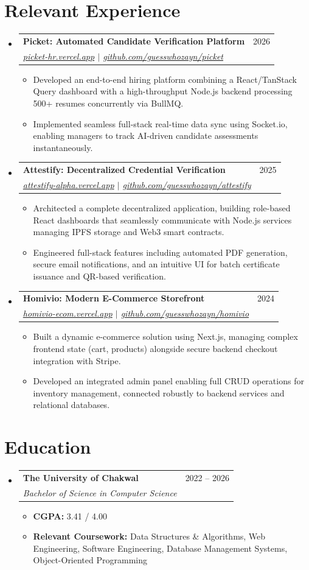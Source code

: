 \documentclass[letterpaper,11pt]{article}
\makeatletter
\newcommand{\resumeItem}[1]{
  \item\small{#1 \vspace{-2pt}}
}
\newcommand{\resumeSubheading}[4]{
  \vspace{-2pt}\item
    \begin{tabular*}{0.97\textwidth}[t]{l@{\extracolsep{\fill}}r}
      \textbf{#1} & #2 \\
      \textit{\small#3} & \textit{\small #4} \\
    \end{tabular*}\vspace{-7pt}
}
\newcommand{\resumeSubHeadingListStart}{\begin{itemize}[leftmargin=0.15in, label={}]}
\newcommand{\resumeSubHeadingListEnd}{\end{itemize}}
\newcommand{\resumeItemListStart}{\begin{itemize}}
\newcommand{\resumeItemListEnd}{\end{itemize}\vspace{-5pt}}
\makeatother
\begin{document}
\section{Relevant Experience}
\resumeSubHeadingListStart

  \resumeSubheading
    {Picket: Automated Candidate Verification Platform}{2026}
    {\href{https://picket-hr.vercel.app}{picket-hr.vercel.app} $|$ \href{https://github.com/guesswhozayn/picket}{github.com/guesswhozayn/picket}}{}
    \resumeItemListStart
      \resumeItem{Developed an end-to-end hiring platform combining a React/TanStack Query dashboard with a high-throughput Node.js backend processing 500+ resumes concurrently via BullMQ.}
      \resumeItem{Implemented seamless full-stack real-time data sync using Socket.io, enabling managers to track AI-driven candidate assessments instantaneously.}
    \resumeItemListEnd

  \resumeSubheading
    {Attestify: Decentralized Credential Verification}{2025}
    {\href{https://attestify-alpha.vercel.app}{attestify-alpha.vercel.app} $|$ \href{https://github.com/guesswhozayn/attestify}{github.com/guesswhozayn/attestify}}{}
    \resumeItemListStart
      \resumeItem{Architected a complete decentralized application, building role-based React dashboards that seamlessly communicate with Node.js services managing IPFS storage and Web3 smart contracts.}
      \resumeItem{Engineered full-stack features including automated PDF generation, secure email notifications, and an intuitive UI for batch certificate issuance and QR-based verification.}
    \resumeItemListEnd

  \resumeSubheading
    {Homivio: Modern E-Commerce Storefront}{2024}
    {\href{https://homivio-ecom.vercel.app}{homivio-ecom.vercel.app} $|$ \href{https://github.com/guesswhozayn/homivio}{github.com/guesswhozayn/homivio}}{}
    \resumeItemListStart
      \resumeItem{Built a dynamic e-commerce solution using Next.js, managing complex frontend state (cart, products) alongside secure backend checkout integration with Stripe.}
      \resumeItem{Developed an integrated admin panel enabling full CRUD operations for inventory management, connected robustly to backend services and relational databases.}
    \resumeItemListEnd

\resumeSubHeadingListEnd

\section{Education}
\resumeSubHeadingListStart
  \resumeSubheading
    {The University of Chakwal}{2022 -- 2026}
    {Bachelor of Science in Computer Science}{}
    \resumeItemListStart
      \resumeItem{\textbf{CGPA:} 3.41 / 4.00}
      \resumeItem{\textbf{Relevant Coursework:} Data Structures \& Algorithms, Web Engineering, Software Engineering, Database Management Systems, Object-Oriented Programming}
    \resumeItemListEnd
\resumeSubHeadingListEnd
\end{document}
